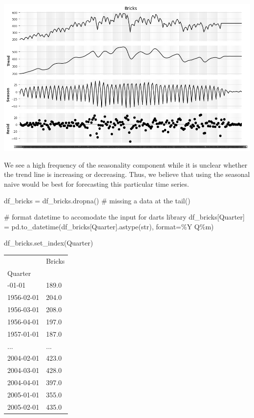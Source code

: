 \documentclass[
  11pt,
]{article}
\newenvironment{Shaded}{\begin{snugshade}}{\end{snugshade}}
\newcommand{\BuiltInTok}[1]{\textcolor[rgb]{0.00,0.23,0.31}{#1}}
\newcommand{\CommentTok}[1]{\textcolor[rgb]{0.37,0.37,0.37}{#1}}
\newcommand{\NormalTok}[1]{\textcolor[rgb]{0.00,0.23,0.31}{#1}}
\newcommand{\OperatorTok}[1]{\textcolor[rgb]{0.37,0.37,0.37}{#1}}
\newcommand{\StringTok}[1]{\textcolor[rgb]{0.13,0.47,0.30}{#1}}
\begin{document}
\includegraphics{hw3_files/figure-pdf/cell-12-output-1.png}

We see a high frequency of the seasonality component while it is unclear
whether the trend line is increasing or decreasing. Thus, we believe
that using the seasonal naive would be best for forecasting this
particular time series.

\begin{Shaded}
\begin{Highlighting}[]
\NormalTok{df\_bricks }\OperatorTok{=}\NormalTok{ df\_bricks.dropna() }\CommentTok{\# missing a data at the tail() }

\CommentTok{\# format datetime to accomodate the input for darts library}
\NormalTok{df\_bricks[}\StringTok{\textquotesingle{}Quarter\textquotesingle{}}\NormalTok{] }\OperatorTok{=}\NormalTok{ pd.to\_datetime(df\_bricks[}\StringTok{\textquotesingle{}Quarter\textquotesingle{}}\NormalTok{].astype(}\BuiltInTok{str}\NormalTok{), }\BuiltInTok{format}\OperatorTok{=}\StringTok{\textquotesingle{}\%Y Q\%m\textquotesingle{}}\NormalTok{)}

\NormalTok{df\_bricks.set\_index(}\StringTok{\textquotesingle{}Quarter\textquotesingle{}}\NormalTok{)}
\end{Highlighting}
\end{Shaded}

\begin{longtable}[]{@{}ll@{}}
\toprule\noalign{}
& Bricks \\
Quarter & \\
\midrule\noalign{}
\endhead
\bottomrule\noalign{}
\endlastfoot
1956-01-01 & 189.0 \\
1956-02-01 & 204.0 \\
1956-03-01 & 208.0 \\
1956-04-01 & 197.0 \\
1957-01-01 & 187.0 \\
... & ... \\
2004-02-01 & 423.0 \\
2004-03-01 & 428.0 \\
2004-04-01 & 397.0 \\
2005-01-01 & 355.0 \\
2005-02-01 & 435.0 \\
\end{longtable}
\end{document}
